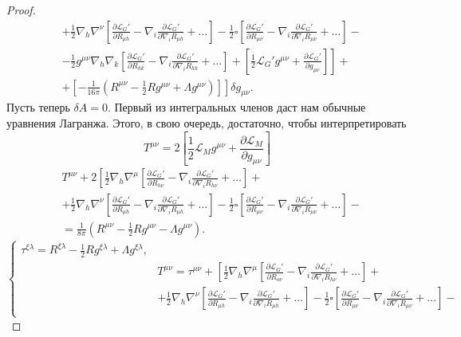 \documentclass[a4paper, 14pt]{scrarticle}
\theoremstyle{Imperial}
\begin{document}
\begin{proof}
$$\begin{aligned}
			&+ \frac{1}{2} \nabla_{h} \nabla^{\nu} \left[ \frac{\partial \mathcal{L}_G'}{\partial R_{\mu h}} - \nabla_i \frac{\partial \mathcal{L}_G'}{\partial \nabla_i R_{\mu h}} + \dots \right] -\frac{1}{2}\square \left[ \frac{\partial \mathcal{L}_G'}{\partial R_{\mu\nu}} - \nabla_i \frac{\partial \mathcal{L}_G'}{\partial \nabla_i R_{\mu\nu}} + \dots \right] -\\
			&\left. - \frac{1}{2}g^{\mu\nu}\nabla_{h}\nabla_{k} \left[ \frac{\partial \mathcal{L}_G'}{\partial R_{hk}} - \nabla_i \frac{\partial \mathcal{L}_G'}{\partial \nabla_i R_{hk}} + \dots \right] + \left[ \frac{1}{2} \mathcal{L}_G' g^{\mu\nu} + \frac{\partial\mathcal{L}_G'}{\partial g_{\mu\nu}} \right] \right] +\\ 
			&\left.+ \left[ -\frac{1}{16\pi} \left( R^{\mu\nu} - \frac{1}{2} R g^{\mu\nu} + \Lambda g^{\mu\nu}\right) \right] \right] \delta g_{\mu\nu}.
		\end{aligned}$$
		Пусть теперь $\delta A =0$. Первый из интегральных членов даст нам обычные уравнения Лагранжа. Этого, в свою очередь, достаточно, чтобы интерпретировать
		$$T^{\mu\nu} = 2 \left[  \frac{1}{2} \mathcal{L}_M g^{\mu\nu} + \frac{\partial\mathcal{L}_M}{\partial g_{\mu\nu}} \right]$$
		$$\begin{aligned}
			& T^{\mu\nu}+ 2 \left[ \frac{1}{2} \nabla_{h}\nabla^{\mu} \left[ \frac{\partial \mathcal{L}_G'}{\partial R_{h\nu}} - \nabla_i \frac{\partial \mathcal{L}_G'}{\partial \nabla_i R_{h\nu}} + \dots \right] \right. +\\ 
			&+ \frac{1}{2} \nabla_{h} \nabla^{\nu} \left[ \frac{\partial \mathcal{L}_G'}{\partial R_{\mu h}} - \nabla_i \frac{\partial \mathcal{L}_G'}{\partial \nabla_i R_{\mu h}} + \dots \right] -\frac{1}{2}\square \left[ \frac{\partial \mathcal{L}_G'}{\partial R_{\mu\nu}} - \nabla_i \frac{\partial \mathcal{L}_G'}{\partial \nabla_i R_{\mu\nu}} + \dots \right] -\\
			&= \frac{1}{8\pi} \left( R^{\mu\nu} - \frac{1}{2} R g^{\mu\nu} - \Lambda g^{\mu\nu} \right).
		\end{aligned}$$	
		$$\left\lbrace\begin{aligned}
			\tau^{\xi\lambda} = R^{\xi\lambda} - \frac{1}{2} R g^{\xi\lambda} + \Lambda g^{\xi\lambda},\\
			&T^{\mu\nu} = \tau^{\mu\nu} + \left[ \frac{1}{2} \nabla_{h}\nabla^{\mu} \left[ \frac{\partial \mathcal{L}_G'}{\partial R_{o\nu}} - \nabla_i \frac{\partial \mathcal{L}_G'}{\partial \nabla_i R_{h\nu}} + \dots \right] \right. +\\ 
			&+ \frac{1}{2} \nabla_{h} \nabla^{\nu} \left[ \frac{\partial \mathcal{L}_G'}{\partial R_{\mu h}} - \nabla_i \frac{\partial \mathcal{L}_G'}{\partial \nabla_i R_{\mu h}} + \dots \right] -\frac{1}{2}\square \left[ \frac{\partial \mathcal{L}_G'}{\partial R_{\mu\nu}} - \nabla_i \frac{\partial \mathcal{L}_G'}{\partial \nabla_i R_{\mu\nu}} + \dots \right] -\\

\end{aligned}$$
\end{proof}
\end{document}
